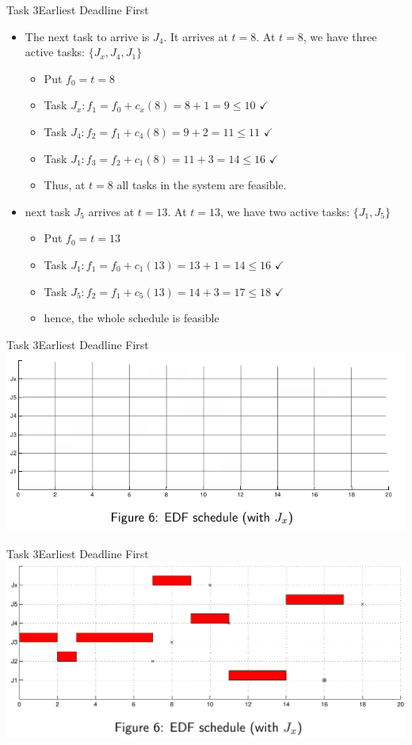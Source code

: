 \begin{frame}[allowframebreaks]{Task 3}{Earliest Deadline First}
\begin{itemize}
\begin{itemize}
      \item Task $J_1: f_3=f_2+c_1(3)=9+3=12 \leq 16$ $\checkmark$
      \item Thus, at $t=3$ \alert{all} tasks in the system are feasible
    \end{itemize}
\item The next task to arrive is $J_4$. It arrives at $t=8$. At $t=8$, we have three active tasks: $\{J_x, J_4, J_1\}$
  \begin{itemize}
    \item Put $f_0=t=8$
    \item Task $J_x: f_1=f_0+c_x(8)=8+1=9 \leq 10$ $\checkmark$
    \item Task $J_4: f_2=f_1+c_4(8)=9+2=11 \leq 11$ $\checkmark$
    \item Task $J_1: f_3=f_2+c_1(8)=11+3=14 \leq 16$ $\checkmark$
    \item Thus, at $t=8$ \alert{all} tasks in the system are feasible.
  \end{itemize}
\item next task $J_5$ arrives at $t=13$. At $t=13$, we have two active tasks: $\{J_1, J_5\}$
    \begin{itemize}
      \item Put $f_0=t=13$
      \item Task $J_1: f_1=f_0+c_1(13)=13+1=14 \leq 16$ $\checkmark$
      \item Task $J_5: f_2=f_1+c_5(13)=14+3=17 \leq 18$ $\checkmark$
      \item hence, the whole \alert{schedule is feasible}
    \end{itemize}
  \end{itemize}
\end{frame}

\begin{frame}{Task 3}{Earliest Deadline First}
  \includegraphics[width=\textwidth]{./figures/3_empty_2.png}
\end{frame}

\begin{frame}{Task 3}{Earliest Deadline First}
  \includegraphics[width=\textwidth]{./figures/3_sol_2.png}
\end{frame}
